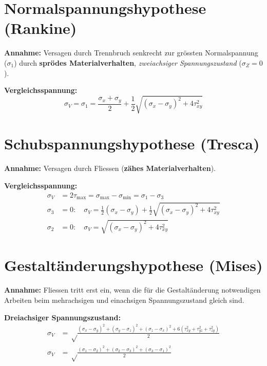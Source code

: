
\section{Normalspannungshypothese (Rankine)} %
	\textbf{Annahme:} Versagen durch Trennbruch senkrecht zur grössten Normalspannung ($\sigma_1$) durch \textbf{sprödes Materialverhalten}, \emph{zweiachsiger Spannungszustand} ($\sigma_Z = 0$).
	
	\textbf{Vergleichsspannung:}
	\begin{equation*}
		\sigma_V = \sigma_1= \frac{\sigma_x + \sigma_y}{2} + \frac{1}{2} \sqrt{(\sigma_x - \sigma_y)^2 + 4 \tau_{xy}^2}
	\end{equation*}
\section{Schubspannungshypothese (Tresca)} %
	\textbf{Annahme:} Versagen durch Fliessen (\textbf{zähes Materialverhalten}).
	
	\textbf{Vergleichsspannung:}
	\begin{align*}
		\sigma_V &= 2 \tau_{\text{max}} = \sigma_{\text{max}}-\sigma_{\text{min}} = \sigma_1 - \sigma_3 \\
		\sigma_3 &= 0: \quad \sigma_V = \frac{1}{2} (\sigma_x - \sigma_y) + \frac{1}{2}\sqrt{(\sigma_x-\sigma_y)^2 + 4 \tau_{xy}^2} \\
		\sigma_2 &= 0: \quad \sigma_V = \sqrt{(\sigma_x - \sigma_y)^2 + 4 \tau_{xy}^2}
	\end{align*}
\section{Gestaltänderungshypothese (Mises)} %
	\textbf{Annahme:} Fliessen tritt erst ein, wenn die für die Gestaltänderung notwendigen Arbeiten beim mehrachsigen und einachsigen Spannungszustand gleich sind.
	
	\textbf{Dreiachsiger Spannungszustand:}
	{\setlength{\mathindent}{0pt}
	\begin{align*}
		\sigma_V &= \sqrt\frac{(\sigma_x - \sigma_y)^2 + (\sigma_y - \sigma_z)^2 + (\sigma_z - \sigma_x)^2 + 6(\tau_{xy}^2 + \tau_{yz}^2 + \tau_{zy}^2)}{2} \\
		\sigma_V &= \sqrt\frac{(\sigma_1 - \sigma_2)^2 + (\sigma_2 - \sigma_3)^2 + (\sigma_3 - \sigma_1)^2}{2} 
	\end{align*}}
	
